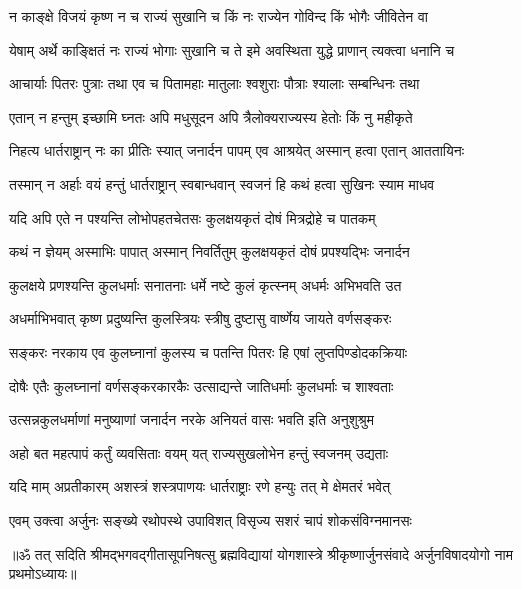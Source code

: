 \twolineshloka
{न काङ्क्षे विजयं कृष्ण न च राज्यं सुखानि च}
{किं नः राज्येन गोविन्द किं भोगैः जीवितेन वा}%

\twolineshloka
{येषाम् अर्थे काङ्क्षितं नः राज्यं भोगाः सुखानि च}
{ते इमे अवस्थिता युद्धे प्राणान् त्यक्त्वा धनानि च}%

\twolineshloka
{आचार्याः पितरः पुत्राः तथा एव च पितामहाः}
{मातुलाः श्वशुराः पौत्राः श्यालाः सम्बन्धिनः तथा}%

\twolineshloka
{एतान् न हन्तुम् इच्छामि घ्नतः अपि मधुसूदन}
{अपि त्रैलोक्यराज्यस्य हेतोः किं नु महीकृते}%

\twolineshloka
{निहत्य धार्तराष्ट्रान् नः का प्रीतिः स्यात् जनार्दन}
{पापम् एव आश्रयेत् अस्मान् हत्वा एतान् आततायिनः}%

\twolineshloka
{तस्मान् न अर्हाः वयं हन्तुं धार्तराष्ट्रान् स्वबान्धवान्}
{स्वजनं हि कथं हत्वा सुखिनः स्याम माधव}%

\twolineshloka
{यदि अपि एते न पश्यन्ति लोभोपहतचेतसः}
{कुलक्षयकृतं दोषं मित्रद्रोहे च पातकम्}%

\twolineshloka
{कथं न ज्ञेयम् अस्माभिः पापात् अस्मान् निवर्तितुम्}
{कुलक्षयकृतं दोषं प्रपश्यद्भिः जनार्दन}%

\twolineshloka
{कुलक्षये प्रणश्यन्ति कुलधर्माः सनातनाः}
{धर्मे नष्टे कुलं कृत्स्नम् अधर्मः अभिभवति उत}%

\twolineshloka
{अधर्माभिभवात् कृष्ण प्रदुष्यन्ति कुलस्त्रियः}
{स्त्रीषु दुष्टासु वार्ष्णेय जायते वर्णसङ्करः}%

\twolineshloka
{सङ्करः नरकाय एव कुलघ्नानां कुलस्य च}
{पतन्ति पितरः हि एषां लुप्तपिण्डोदकक्रियाः}%

\twolineshloka
{दोषैः एतैः कुलघ्नानां वर्णसङ्करकारकैः}
{उत्साद्यन्ते जातिधर्माः कुलधर्माः च शाश्वताः}%

\twolineshloka
{उत्सन्नकुलधर्माणां मनुष्याणां जनार्दन}
{नरके अनियतं वासः भवति इति अनुशुश्रुम}%

\twolineshloka
{अहो बत महत्पापं कर्तुं व्यवसिताः वयम्}
{यत् राज्यसुखलोभेन हन्तुं स्वजनम् उद्यताः}%

\twolineshloka
{यदि माम् अप्रतीकारम् अशस्त्रं शस्त्रपाणयः}
{धार्तराष्ट्राः रणे हन्युः तत् मे क्षेमतरं भवेत्}%


\twolineshloka
{एवम् उक्त्वा अर्जुनः सङ्ख्ये रथोपस्थे उपाविशत्}
{विसृज्य सशरं चापं शोकसंविग्नमानसः}%

{॥ॐ तत् सदिति श्रीमद्भगवद्गीतासूपनिषत्सु ब्रह्मविद्यायां योगशास्त्रे श्रीकृष्णार्जुनसंवादे अर्जुनविषादयोगो नाम प्रथमोऽध्यायः॥}

